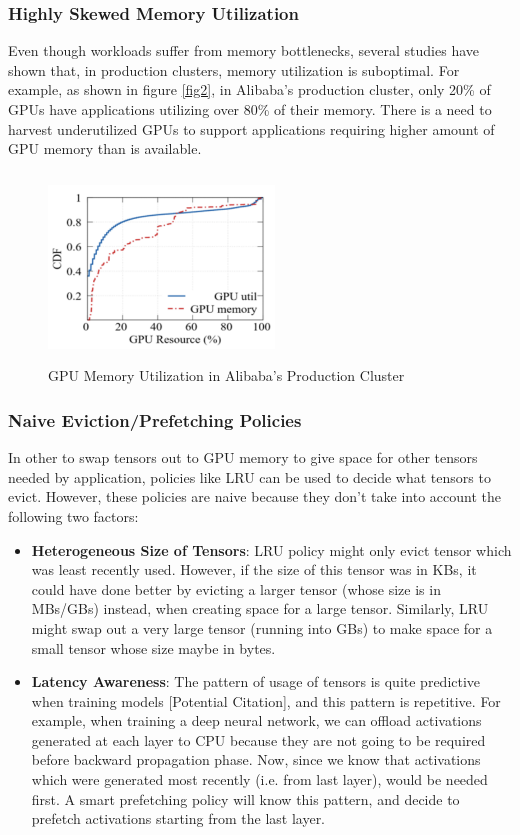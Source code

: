 \documentclass{article}
\begin{document}
	\subsubsection{Highly Skewed Memory Utilization}
	Even though workloads suffer from memory bottlenecks, several studies have shown that, in production clusters, memory utilization
	is suboptimal. For example, as shown in figure \ref{fig2}, in Alibaba's production cluster, only 20\% of GPUs have applications
	utilizing over 80\% of their memory. There is a need to harvest underutilized GPUs to support applications requiring 
	higher amount of GPU memory than is available.
	\begin{figure}[!htbp]
		\centering
		\includegraphics[height=5cm, width=6cm]{figures/AlibabaUtil.png}
		\caption{GPU Memory Utilization in Alibaba's Production Cluster}
	\end{figure}
	\label{fig2}
	\FloatBarrier

	\subsubsection{Naive Eviction/Prefetching Policies} In other to swap tensors out to GPU memory to give space for other tensors needed by application,
	policies like LRU can be used to decide what tensors to evict. However, these policies are naive because they don't take into account the following two factors:
	\begin{itemize}
		\item \textbf{Heterogeneous Size of Tensors}: LRU policy might only evict tensor which was least recently used. However, 
		if the size of this tensor was in KBs, it could have done better by evicting a larger tensor (whose size is in MBs/GBs) instead,
		when creating space for a large tensor. Similarly, LRU might swap out a very large tensor (running into GBs) to make space for a small tensor whose size maybe in bytes.
		\item \textbf{Latency Awareness}: The pattern of usage of tensors is quite predictive when training models [Potential Citation], and this pattern is repetitive. For example,
		when training a deep neural network, we can offload activations generated at each layer to CPU because they are not going to be required before backward propagation phase.
		Now, since we know that activations which were generated most recently (i.e. from last layer), would be needed first.
		A smart prefetching policy will know this pattern, and decide to prefetch activations starting from the last layer.
	\end{itemize}
\end{document}
